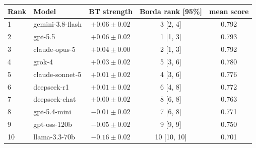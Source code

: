 \begin{tabular}{llccc}
\toprule
Rank & Model & BT strength & Borda rank [95\%] & mean score \\
\midrule
1 & gemini-3.8-flash & $+0.06 \pm 0.02$ & 3 [2, 4] & 0.792 \\
2 & gpt-5.5 & $+0.06 \pm 0.02$ & 1 [1, 3] & 0.793 \\
3 & claude-opus-5 & $+0.04 \pm 0.00$ & 2 [1, 3] & 0.792 \\
4 & grok-4 & $+0.03 \pm 0.02$ & 5 [3, 6] & 0.780 \\
5 & claude-sonnet-5 & $+0.01 \pm 0.02$ & 4 [3, 6] & 0.776 \\
6 & deepseek-r1 & $+0.01 \pm 0.02$ & 6 [4, 8] & 0.772 \\
7 & deepseek-chat & $+0.00 \pm 0.02$ & 8 [6, 8] & 0.763 \\
8 & gpt-5.4-mini & $-0.01 \pm 0.02$ & 7 [6, 8] & 0.771 \\
9 & gpt-oss-120b & $-0.05 \pm 0.02$ & 9 [9, 9] & 0.750 \\
10 & llama-3.3-70b & $-0.16 \pm 0.02$ & 10 [10, 10] & 0.701 \\
\bottomrule
\end{tabular}
